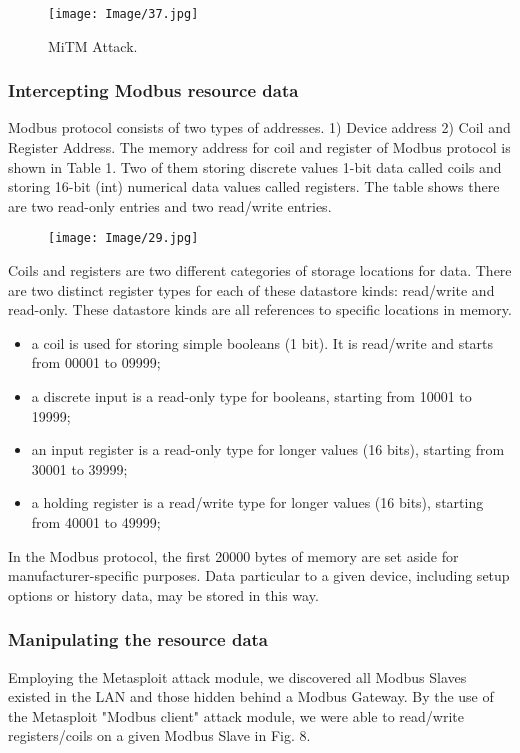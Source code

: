\documentclass[letterpaper,10pt,conference]{IEEEtran}
\begin{document}
\begin{figure}[h!]
\centering
\texttt{[image: Image/37.jpg]}
\caption{MiTM Attack.}
\label{Fig. 6}
\end{figure}

\subsubsection{Intercepting Modbus resource data}
Modbus protocol consists of two types of addresses. 1) Device address 2) Coil and Register Address. The memory address for coil and register of Modbus protocol is shown in Table 1. Two of them storing discrete values 1-bit data called coils and storing 16-bit (int) numerical data values called registers. The table shows there are two read-only entries and two read/write entries.
\begin{figure}[h!]
\centering
\texttt{[image: Image/29.jpg]}
\end{figure}

Coils and registers are two different categories of storage locations for data. There are two distinct register types for each of these datastore kinds: read/write and read-only. These datastore kinds are all references to specific locations in memory.
\begin{itemize}
    \item a coil is used for storing simple booleans (1 bit). It is read/write and starts from 00001 to 09999;
    \item a discrete input is a read-only type for booleans, starting from 10001 to 19999;
    \item an input register is a read-only type for longer values (16 bits), starting from 30001 to 39999;
    \item a holding register is a read/write type for longer values (16 bits), starting from 40001 to 49999;
\end{itemize}

In the Modbus protocol, the first 20000 bytes of memory are set aside for manufacturer-specific purposes. Data particular to a given device, including setup options or history data, may be stored in this way.

\subsubsection{Manipulating the resource data}
Employing the Metasploit attack module, we discovered all Modbus Slaves existed in the LAN and those hidden behind a Modbus Gateway. By the use of the Metasploit "Modbus client" attack module, we were able to read/write registers/coils on a given Modbus Slave in Fig. 8.  
\end{document}
